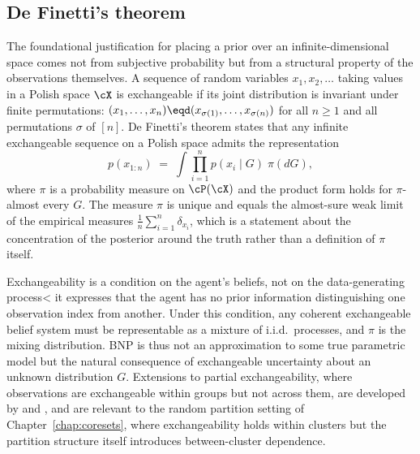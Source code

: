 \subsection{De Finetti's theorem}
\label{subsec:intro:definetti}

The foundational justification for placing a prior over an
infinite-dimensional space comes not from subjective probability but from a
structural property of the observations themselves.  A sequence of random
variables $x_1, x_2, \ldots$ taking values in a Polish space $\cX$ is
exchangeable if its joint distribution is invariant under finite
permutations: $(x_1, \ldots, x_n) \eqd (x_{\sigma(1)}, \ldots,
x_{\sigma(n)})$ for all $n \geq 1$ and all permutations $\sigma$ of $[n]$.
De Finetti's theorem \citep{deFinetti1937, HewittSavage1955} states that
any infinite exchangeable sequence on a Polish space admits the
representation
\begin{equation}
  p(x_{1:n})
  \;=\;
  \int \prod_{i=1}^{n} p(x_i \mid G)\; \pi(dG),
  \label{eq:definetti}
\end{equation}
where $\pi$ is a probability measure on $\cP(\cX)$ and the product form
holds for $\pi$-almost every $G$.  The measure $\pi$ is unique and equals
the almost-sure weak limit of the empirical measures $\frac{1}{n}
\sum_{i=1}^n \delta_{x_i}$, which is a statement about the concentration
of the posterior around the truth rather than a definition of $\pi$
itself.

Exchangeability is a condition on the agent's beliefs, not on the
data-generating process< it expresses that the agent has no prior
information distinguishing one observation index from another.  Under this
condition, any coherent exchangeable
belief system must be representable as a mixture of i.i.d.\ processes, and
$\pi$ is the mixing distribution.  BNP is thus not an approximation to
some true parametric model but the natural consequence of exchangeable
uncertainty about an unknown distribution $G$.  Extensions to partial
exchangeability, where observations are exchangeable within groups but
not across them, are developed by \citet{Kingman1978} and
\citet{Aldous1985}, and are relevant to the random partition setting of
Chapter~\ref{chap:coresets}, where exchangeability holds within clusters
but the partition structure itself introduces between-cluster dependence.

